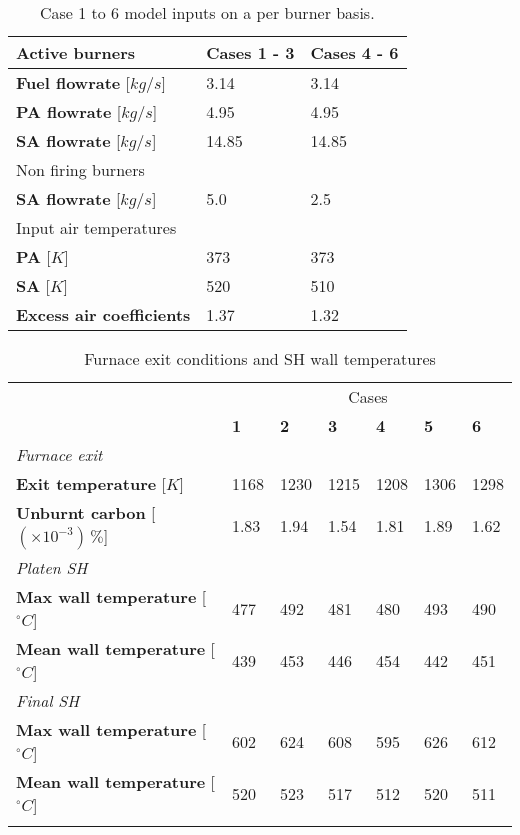 \documentclass[11pt,cleanfoot]{asme2ej}
\begin{document}
\newpage
\begin{table}[h!]
\centering
\caption{Case 1 to 6 model inputs on a per burner basis.}
\label{tbl_case_inputs}
\vspace{2mm}
{\tabulinesep=1.2mm
\begin{tabularx}{\textwidth}{p{} p{} l}
\hline
Active burners & \textbf{Cases 1 - 3} & \textbf{Cases 4 - 6}\\
\hline
\textbf{Fuel flowrate} [$kg/s$]&3.14  &3.14\\
\textbf{PA flowrate} [$kg/s$]&4.95  &4.95\\
\textbf{SA flowrate} [$kg/s$]&14.85  &14.85\\
\hline
Non firing burners &  & \\
\hline
\textbf{SA flowrate} [$kg/s$]&5.0  &2.5\\
\hline
Input air temperatures& &\\
\hline
\textbf{PA} [$K$]&373  &373\\
\textbf{SA} [$K$]&520  &510\\
\hline
\textbf{Excess air coefficients} & 1.37 & 1.32\\
\hline
\end{tabularx}}
\end{table}

\newpage

\begin{table}[h!]
\centering
\caption{Furnace exit conditions and SH wall temperatures}
\vspace{2mm}
\begin{tabularx}{\textwidth}{p{} XXXXXX}
\hline
&\multicolumn{6}{c}{Cases}\\
 & \textbf{1} & \textbf{2} & \textbf{3}& \textbf{4}&\textbf{5}&\textbf{6}\\
\hline
\multicolumn{7}{l}{\textit{Furnace exit}}\\
\textbf{Exit temperature} [$K$] & 1168 & 1230 & 1215 & 1208 & 1306 & 1298\\
\textbf{Unburnt carbon} [$(\times 10^{-3})\,\%$] & 1.83 & 1.94 & 1.54 & 1.81 & 1.89 & 1.62\\
\multicolumn{7}{l}{\textit{Platen SH}}\\
\textbf{Max wall temperature} [$^{\circ}C$]  &477 & 492 & 481  & 480 & 493 & 490\\
\textbf{Mean wall temperature} [$^{\circ}C$] &439 & 453 & 446 & 454 & 442 & 451\\
\multicolumn{7}{l}{\textit{Final SH}}\\
\textbf{Max wall temperature} [$^{\circ}C$]  & 602 & 624 & 608 & 595 & 626 & 612\\
\textbf{Mean wall temperature} [$^{\circ}C$] & 520 & 523 & 517 & 512 & 520 & 511\\
\hline
\label{tbl_cfd_results}
\end{tabularx}
\vspace{-10mm}
\end{table}
\end{document}
